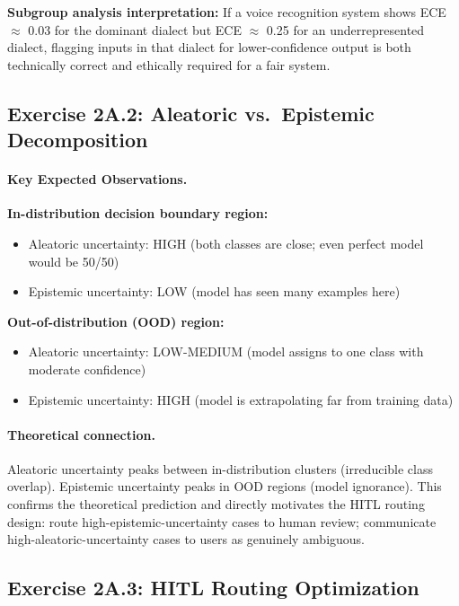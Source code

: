 \textbf{Subgroup analysis interpretation:} If a voice recognition system shows ECE $\approx$ 0.03 for the dominant dialect but ECE $\approx$ 0.25 for an underrepresented dialect, flagging inputs in that dialect for lower-confidence output is both technically correct and ethically required for a fair system.

\subsection{Exercise 2A.2: Aleatoric vs.\ Epistemic Decomposition}

\paragraph{Key Expected Observations.}

\textbf{In-distribution decision boundary region:}
\begin{itemize}
    \item Aleatoric uncertainty: HIGH (both classes are close; even perfect model would be 50/50)
    \item Epistemic uncertainty: LOW (model has seen many examples here)
\end{itemize}

\textbf{Out-of-distribution (OOD) region:}
\begin{itemize}
    \item Aleatoric uncertainty: LOW-MEDIUM (model assigns to one class with moderate confidence)
    \item Epistemic uncertainty: HIGH (model is extrapolating far from training data)
\end{itemize}

\paragraph{Theoretical connection.} Aleatoric uncertainty peaks between in-distribution clusters (irreducible class overlap). Epistemic uncertainty peaks in OOD regions (model ignorance). This confirms the theoretical prediction and directly motivates the HITL routing design: route high-epistemic-uncertainty cases to human review; communicate high-aleatoric-uncertainty cases to users as genuinely ambiguous.

\subsection{Exercise 2A.3: HITL Routing Optimization}

